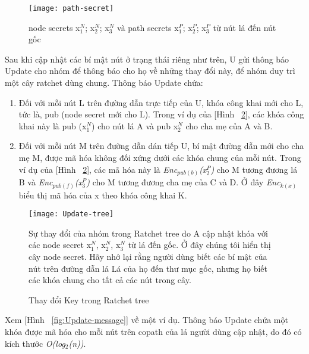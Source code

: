 \documentclass[../main-report.tex]{subfiles}
\begin{document}
\begin{figure}[!h]
\begin{center}
\label{fig:path-secret}
\texttt{[image: path-secret]}
\caption{node secrets x$_{1}^{N}$; x$_{2}^{N}$; x$_{3}^{N}$ và path secrets x$_{1}^{P}$; x$_{2}^{P}$; x$_{3}^{P}$ từ nút lá đến nút gốc}
\end{center}
\end{figure}

Sau khi cập nhật các bí mật nút ở trạng thái riêng như trên, U gửi thông báo \gls{Update} cho nhóm để thông báo cho họ về những thay đổi này, để nhóm duy trì một cây ratchet dùng chung. Thông báo \gls{Update} chứa:

\begin{enumerate}
	\item{Đối với mỗi nút L trên đường dẫn trực tiếp của U, khóa công khai mới cho L, tức là, pub (node secret mới cho L). Trong ví dụ của [Hình ~\ref{fig:Update-tree}], các khóa công khai này là pub (x$_{1}^{N}$) cho nút lá A và pub x$_{2}^{N}$ cho cha mẹ của A và B.}
	\item{Đối với mỗi nút M trên đường dẫn dán tiếp U, bí mật đường dẫn mới cho cha mẹ M, được mã hóa không đối xứng dưới các khóa chung của mỗi nút. Trong ví dụ của [Hình ~\ref{fig:Update-tree}], các mã hóa này là \textit{Enc$_{pub(b)}$(x$^{P}_{2}$)} cho M tương đương lá B và \textit{Enc$_{pub(\textit{f})}$(x$^{P}_{3}$)} cho M tương đương cha mẹ của C và D. Ở đây \textit{Enc$_{k(x)}$} biểu thị mã hóa của x theo khóa công khai K.}
\end{enumerate}

\begin{figure}[!h]
\begin{center}
\label{fig:Update-tree}
\texttt{[image: Update-tree]}
\caption{Thay đổi Key trong Ratchet tree}

{Sự thay đổi của nhóm trong Ratchet tree do A cập nhật khóa với các node secret x$_{1}^{N}$, x$_{2}^{N}$, x$_{3}^{N}$ từ lá đến gốc. Ở đây chúng tôi hiển thị cây node secret. Hãy nhớ lại rằng người dùng biết các bí mật của nút trên đường dẫn lá Lá của họ đến thư mục gốc, nhưng họ biết các khóa chung cho tất cả các nút trong cây.}
\end{center}
\end{figure}

Xem [Hình ~\ref{fig:Update-message}] về một ví dụ. Thông báo \gls{Update} chứa một khóa được mã hóa cho mỗi nút trên copath của lá người dùng cập nhật, do đó có kích thước \textit{O(log$_{2}$(n))}.
\end{document}

